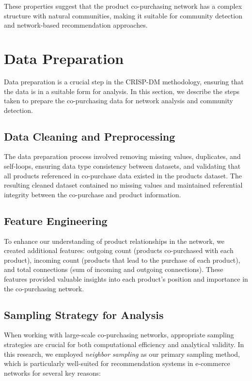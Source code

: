 \documentclass[conference]{IEEEtran}
\begin{document}
These properties suggest that the product co-purchasing network has a complex structure with natural communities, making it suitable for community detection and network-based recommendation approaches.

\section{Data Preparation}
Data preparation is a crucial step in the CRISP-DM methodology, ensuring that the data is in a suitable form for analysis. In this section, we describe the steps taken to prepare the co-purchasing data for network analysis and community detection.

\subsection{Data Cleaning and Preprocessing}
The data preparation process involved removing missing values, duplicates, and self-loops, ensuring data type consistency between datasets, and validating that all products referenced in co-purchase data existed in the products dataset. The resulting cleaned dataset contained no missing values and maintained referential integrity between the co-purchase and product information.

\subsection{Feature Engineering}
To enhance our understanding of product relationships in the network, we created additional features: outgoing count (products co-purchased with each product), incoming count (products that lead to the purchase of each product), and total connections (sum of incoming and outgoing connections). These features provided valuable insights into each product's position and importance in the co-purchasing network.

\subsection{Sampling Strategy for Analysis}
\label{sec:sampling}
When working with large-scale co-purchasing networks, appropriate sampling strategies are crucial for both computational efficiency and analytical validity. In this research, we employed \textit{neighbor sampling} as our primary sampling method, which is particularly well-suited for recommendation systems in e-commerce networks for several key reasons:
\end{document}
